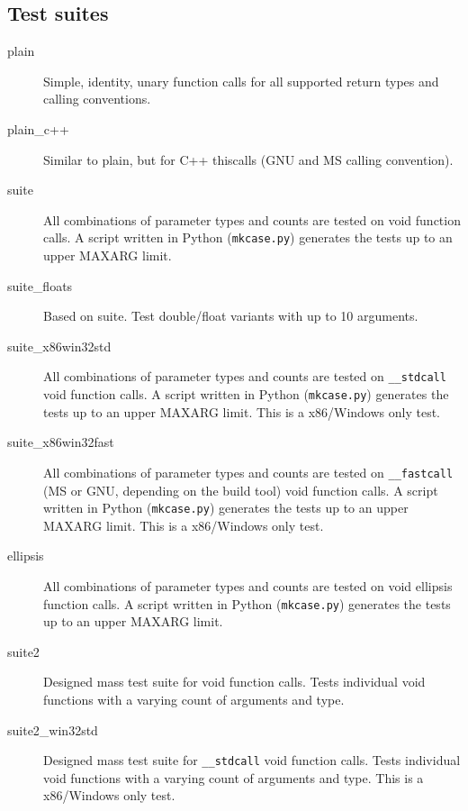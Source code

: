 \subsection{Test suites}

\begin{description}

\item [plain] 
Simple, identity, unary function calls for all supported return types and
calling conventions.

\item [plain\_c++] 
Similar to plain, but for C++ thiscalls (GNU and MS calling convention).

\item [suite] 
All combinations of parameter types and counts are tested on void function
calls. A script written in Python ({\tt mkcase.py}) generates the tests up to
an upper MAXARG limit.

\item [suite\_floats]
Based on suite. Test double/float variants with up to 10 arguments.

\item [suite\_x86win32std] 
All combinations of parameter types and counts are tested on {\tt \_\_stdcall}
void function calls. A script written in Python ({\tt mkcase.py}) generates
the tests up to an upper MAXARG limit. This is a x86/Windows only test.

\item [suite\_x86win32fast] 
All combinations of parameter types and counts are tested on {\tt \_\_fastcall}
(MS or GNU, depending on the build tool) void function calls.
A script written in Python ({\tt mkcase.py}) generates the tests up to
an upper MAXARG limit. This is a x86/Windows only test.

\item [ellipsis]
All combinations of parameter types and counts are tested on void ellipsis 
function calls. A script written in Python ({\tt mkcase.py}) generates the 
tests up to an upper MAXARG limit.

\item [suite2]
Designed mass test suite for void function calls.
Tests individual void functions with a varying count of arguments and type.

\item [suite2\_win32std]
Designed mass test suite for {\tt \_\_stdcall} void function calls.
Tests individual void functions with a varying count of arguments and type.
This is a x86/Windows only test.


\end{description}
